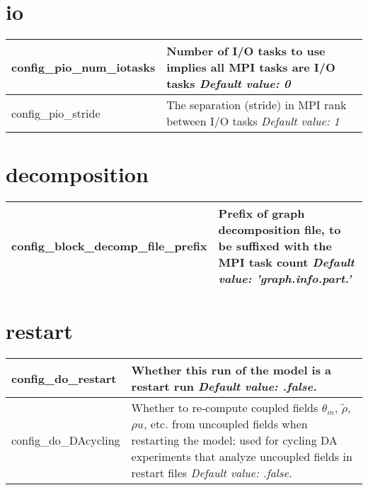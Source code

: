\section{io}

{\small
\begin{longtable}{|p{1.75in} |p{4.5in}|}
 \hline
   config\_pio\_num\_iotasks        & Number of I/O tasks to use \hfill\break 0 implies all MPI tasks are I/O tasks \newline 
   {\em Default value: 0} \\ \hline

   config\_pio\_stride        & The separation (stride) in MPI rank between I/O tasks \newline 
   {\em Default value: 1} \\ \hline
   
\end{longtable}
}

\section{decomposition}

{\small
\begin{longtable}{|p{2.0in} |p{4.25in}|}
 \hline
 
   config\_block\_decomp\_file\_prefix & Prefix of graph decomposition file, to be suffixed with the MPI task count \newline 
   {\em Default value: 'graph.info.part.'} \\ \hline

\end{longtable}
}

\section{restart}

{\small
\begin{longtable}{|p{2.0in} |p{4.25in}|}
 \hline
   config\_do\_restart & Whether this run of the model is a restart run \newline 
   {\em Default value: .false.} \\ \hline
 
   config\_do\_DAcycling & Whether to re-compute coupled fields $\theta_m$, $\tilde\rho$, $\rho u$,  etc. from uncoupled fields when restarting the model; used for cycling DA experiments that analyze uncoupled fields in restart files \newline 
   {\em Default value: .false.} \\ \hline   
\end{longtable}
}

